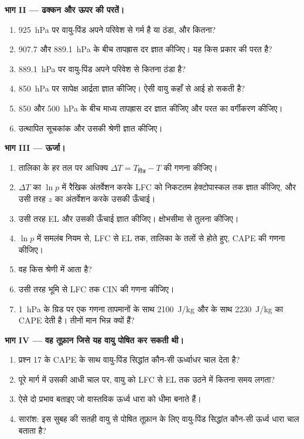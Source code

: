 \begin{problem}[{सप्ताहांत समस्या --- सुबह की साउंडिंग पढ़ना}]
\medskip\noindent\textbf{भाग II --- ढक्कन और ऊपर की परतें।}
\begin{enumerate}[resume]
  \item \qty{925}{hPa} पर वायु-पिंड अपने परिवेश से गर्म है या ठंडा, और कितना?
  \item 907.7 और \qty{889.1}{hPa} के बीच तापह्रास दर ज्ञात कीजिए। यह किस प्रकार की परत है?
  \item \qty{889.1}{hPa} पर वायु-पिंड अपने परिवेश से कितना ठंडा है?
  \item \qty{850}{hPa} पर सापेक्ष आर्द्रता ज्ञात कीजिए। ऐसी वायु कहाँ से आई हो सकती है?
  \item 850 और \qty{500}{hPa} के बीच माध्य तापह्रास दर ज्ञात कीजिए और परत का वर्गीकरण कीजिए।
  \item उत्थापित सूचकांक और उसकी श्रेणी ज्ञात कीजिए।
\end{enumerate}

\medskip\noindent\textbf{भाग III --- ऊर्जा।}
\begin{enumerate}[resume]
  \item तालिका के हर तल पर आधिक्य $\Delta T = T_{\text{पिंड}} - T$ की गणना कीजिए।
  \item $\Delta T$ का $\ln p$ में रैखिक अंतर्वेशन करके LFC को निकटतम हेक्टोपास्कल तक ज्ञात कीजिए,
        और उसी तरह $z$ का अंतर्वेशन करके उसकी ऊँचाई।
  \item उसी तरह EL और उसकी ऊँचाई ज्ञात कीजिए। क्षोभसीमा से तुलना कीजिए।
  \item $\ln p$ में समलंब नियम से, LFC से EL तक, तालिका के
        तलों से होते हुए, CAPE की गणना कीजिए।
  \item वह किस श्रेणी में आता है?
  \item उसी तरह भूमि से LFC तक CIN की गणना कीजिए।
  \item \qty{1}{hPa} के ग्रिड पर एक गणना तापमानों के साथ \qty{2100}{J/kg} और  के साथ
        \qty{2230}{J/kg} का CAPE देती है। तीनों मान भिन्न
        क्यों हैं?
\end{enumerate}

\medskip\noindent\textbf{भाग IV --- वह तूफ़ान जिसे यह वायु पोषित कर सकती थी।}
\begin{enumerate}[resume]
  \item प्रश्न 17 के CAPE के साथ वायु-पिंड सिद्धांत कौन-सी ऊर्ध्वाधर चाल देता है?
  \item पूरे मार्ग में उसकी आधी चाल पर, वायु को LFC से EL तक उठने में कितना समय लगता?
  \item ऐसे दो प्रभाव बताइए जो वास्तविक ऊर्ध्व धारा को धीमा बनाते हैं।
  \item सारांश: इस सुबह की सतही वायु से पोषित तूफ़ान के लिए वायु-पिंड सिद्धांत कौन-सी ऊर्ध्व धारा चाल
        बताता है?
\end{enumerate}
\end{problem}
